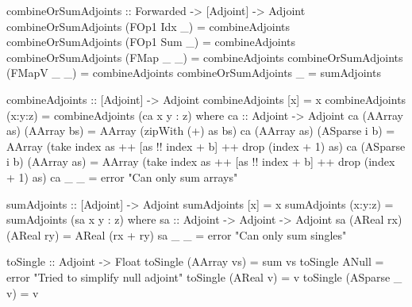         \begin{haskell}[caption={Functions to transform and combine adjoints. \texttt{combineOrSumAdjoints} takes in a step in a trace, and its list of adjoints, and then uses either \texttt{sumAdjoints} or \texttt{combineAdjoints} to return the adjoint for that step. \texttt{combineAdjoints} combines the input adjoints into a single array adjoint. \texttt{sumAdjoints} sums its input adjoints to a single real adjoint. \texttt{toSingle} takes in an adjoint, transforms it into a real adjoint if necessary, and then returns that real as a float. \texttt{toArray} takes in an adjoint and an integer representing length and transforms these into an array adjoint, returning that array adjoint as an array of floats.}, label=lst:combine, gobble=12]
            combineOrSumAdjoints :: Forwarded -> [Adjoint] -> Adjoint
            combineOrSumAdjoints (FOp1  Idx _) = combineAdjoints
            combineOrSumAdjoints (FOp1  Sum _) = combineAdjoints
            combineOrSumAdjoints (FMap  _   _) = combineAdjoints
            combineOrSumAdjoints (FMapV _   _) = combineAdjoints
            combineOrSumAdjoints _             = sumAdjoints

            combineAdjoints :: [Adjoint] -> Adjoint
            combineAdjoints [x]     = x
            combineAdjoints (x:y:z) = combineAdjoints (ca x y : z)
                where
                    ca :: Adjoint -> Adjoint
                    ca (AArray as) (AArray bs)   = AArray (zipWith (+) as bs)
                    ca (AArray as) (ASparse i b) = AArray
                        (take index as ++ [as !! index + b] ++ drop (index + 1) as)
                    ca (ASparse i b) (AArray as) = AArray
                        (take index as ++ [as !! index + b] ++ drop (index + 1) as)
                    ca _           _             = error "Can only sum arrays"
            
            sumAdjoints :: [Adjoint] -> Adjoint
            sumAdjoints [x]     = x
            sumAdjoints (x:y:z) = sumAdjoints (sa x y : z)
                where
                    sa :: Adjoint -> Adjoint -> Adjoint
                    sa (AReal rx) (AReal ry) = AReal (rx + ry)
                    sa _          _          = error "Can only sum singles"
    
            toSingle :: Adjoint -> Float
            toSingle (AArray vs)   = sum vs
            toSingle ANull         = error "Tried to simplify null adjoint"
            toSingle (AReal v)     = v
            toSingle (ASparse _ v) = v
    

\end{haskell}

